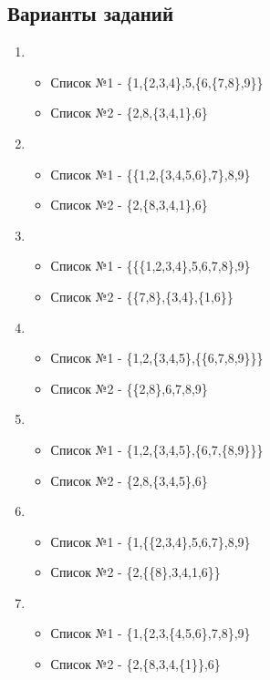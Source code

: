 \documentclass[a4paper,12pt]{article}
\begin{document}
\subsection{Варианты заданий}
\begin{enumerate}
	\item \begin{itemize}
		\item Список №1 - \{1,\{2,3,4\},5,\{6,\{7,8\},9\}\}
		\item Список №2 - \{2,8,\{3,4,1\},6\}
	\end{itemize}

	\item \begin{itemize}
		\item Список №1 - \{\{1,2,\{3,4,5,6\},7\},8,9\}
		\item Список №2 - \{2,\{8,3,4,1\},6\}
	\end{itemize}

	\item \begin{itemize}
		\item Список №1 - \{\{\{1,2,3,4\},5,6,7,8\},9\}
		\item Список №2 - \{\{7,8\},\{3,4\},\{1,6\}\}
	\end{itemize}

	\item \begin{itemize}
		\item Список №1 - \{1,2,\{3,4,5\},\{\{6,7,8,9\}\}\}
		\item Список №2 - \{\{2,8\},6,7,8,9\}
	\end{itemize}

	\item \begin{itemize}
		\item Список №1 - \{1,2,\{3,4,5\},\{6,7,\{8,9\}\}\}
		\item Список №2 - \{2,8,\{3,4,5\},6\}
	\end{itemize}

	\item \begin{itemize}
		\item Список №1 - \{1,\{\{2,3,4\},5,6,7\},8,9\} 
		\item Список №2 - \{2,\{\{8\},3,4,1,6\}\}
	\end{itemize}

	\item \begin{itemize}
		\item Список №1 - \{1,\{2,3,\{4,5,6\},7,8\},9\}
		\item Список №2 - \{2,\{8,3,4,\{1\}\},6\}
	\end{itemize}


\end{enumerate}
\end{document}
